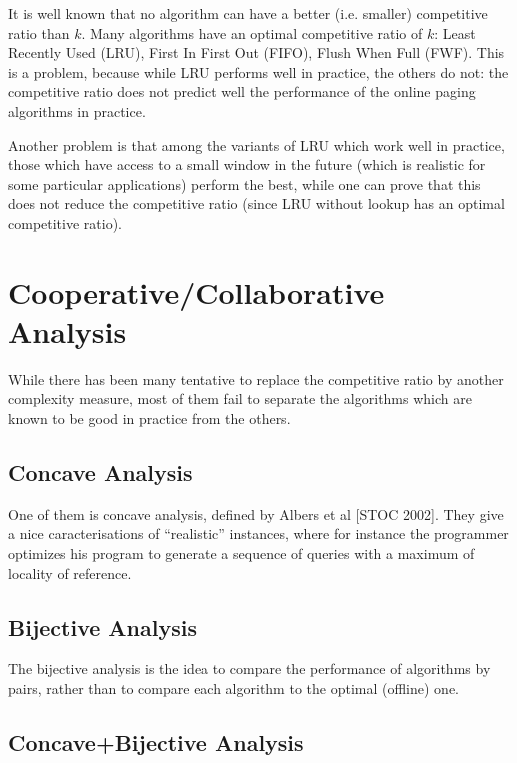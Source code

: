It is well known that no algorithm can have a better (i.e. smaller)
competitive ratio than $k$.
%
Many algorithms have an optimal competitive ratio of $k$:
%
 Least Recently Used (LRU),
%
First In First Out (FIFO),
%
Flush When Full (FWF).
%
This is a problem, because while LRU performs well in practice, the
others do not: the competitive ratio does not predict well the
performance of the online paging algorithms in practice.


Another problem is that among the variants of LRU which work well in
practice, those which have access to a small window in the future
(which is realistic for some particular applications) perform the
best, while one can prove that this does not reduce the competitive
ratio (since LRU without lookup has an optimal competitive ratio).


\section{Cooperative/Collaborative Analysis}
\label{sec:coll-analys}

While there has been many tentative to replace the competitive ratio
by another complexity measure, most of them fail to separate the
algorithms which are known to be good in practice from the others.


\subsection{Concave Analysis}
\label{sec:concave-analysis}

One of them is concave analysis, defined by Albers et al [STOC 2002].
%
They give a nice caracterisations of ``realistic'' instances, where
for instance the programmer optimizes his program to generate a
sequence of queries with a maximum of locality of reference.



\subsection{Bijective Analysis}
\label{sec:bijective-analysis}

The bijective analysis is the idea to compare the performance of
algorithms by pairs, rather than to compare each algorithm to the
optimal (offline) one.

\subsection{Concave+Bijective Analysis}
\label{sec:conc-analys}

